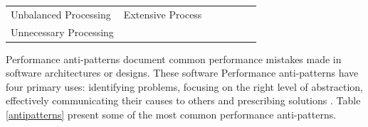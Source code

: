 \documentclass[espaco=umemeio,chapter=TITLE,twoside,openright]{abnt}
\begin{document}
\begin{table}[!h]
\begin{tabular}{|l|l|l|llll}
\multirow{-4}{*}{Unbalanced Processing} & Extensive Process            & \begin{minipage}{0.4\textwidth} \cite{Vetoio2011} \cite{Smith2003}   \end{minipage}                                                                           &  &  &  &  \\ \cline{1-3}
Unnecessary Processing                  &                              & \cite{Smith2003}                                                                                               &  &  &  &  \\ \cline{1-3}
\end{tabular}
\end{table}




Performance anti-patterns document common performance mistakes made in software architectures or designs. These software Performance anti-patterns have four primary uses: identifying problems,
focusing on the
right level of abstraction,
effectively communicating
their causes to others and prescribing solutions \cite{brown1998antipatterns}. Table \ref{antipatterns} present some of the most common performance anti-patterns.


\end{document}
